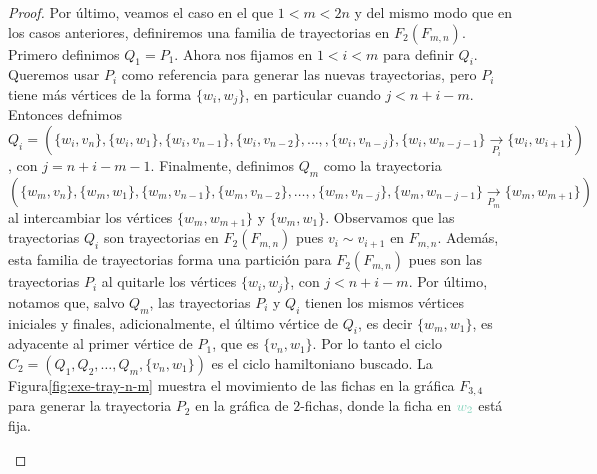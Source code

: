 \begin{proof}
    Por \'ultimo, veamos el caso en el que $1<m<2n$ y del mismo modo que en los
    casos anteriores, definiremos una familia de trayectorias en $F_2(F_{m,n})$.
    Primero definimos $Q_1 =P_1$. Ahora nos fijamos en $1<i<m$ para definir
    $Q_i$. Queremos usar $P_i$ como referencia para generar las nuevas
    trayectorias, pero $P_i$ tiene m\'as v\'ertices de la forma $\{w_i,w_j\}$,
    en particular cuando $j< n+i-m$. Entonces defnimos $Q_i =
    (\{w_i,v_n\},\{w_i,w_1\},\{w_i,v_{n-1}\},\{w_i,v_{n-2}\}, \dots,
    ,\{w_i,v_{n-j}\},\{w_i,w_{n-j-1}\}\xrightarrow[P_i]{}\{w_i,w_{i+1}\})$, con
    $j = n+i-m-1$. Finalmente, definimos $Q_m$ como la trayectoria
    $(\{w_m,v_n\},\{w_m,w_1\},\{w_m,v_{n-1}\},\{w_m,v_{n-2}\}, \dots,
    ,\{w_m,v_{n-j}\},\{w_m,w_{n-j-1}\}\xrightarrow[P_m]{}\{w_m,w_{m+1}\})$ al
    intercambiar los v\'ertices $\{w_m,w_{m+1}\}$ y $\{w_m,w_1\}$. Observamos
    que las trayectorias $Q_i$ son trayectorias en $F_2(F_{m,n})$ pues $v_i \sim
    v_{i+1}$ en $F_{m,n}$. Adem\'as, esta familia de trayectorias forma una
    partici\'on para $F_2(F_{m,n})$ pues son las trayectorias $P_i$ al quitarle
    los v\'ertices $\{w_i,w_j\}$, con $j< n+i-m$. Por \'ultimo, notamos que,
    salvo $Q_m$, las trayectorias $P_i$ y $Q_i$ tienen los mismos v\'ertices
    iniciales y finales, adicionalmente, el \'ultimo v\'ertice de $Q_i$, es
    decir $\{w_m,w_1\}$, es adyacente al primer v\'ertice de $P_1$, que es
    $\{v_n,w_1\}$. Por lo tanto el ciclo $C_2=(Q_1,Q_2, \dots, Q_m,
    \{v_n,w_1\})$ es el ciclo hamiltoniano buscado. La
    Figura\ref{fig:exe-tray-n-m} muestra el movimiento de las fichas en la
    gr\'afica $F_{3,4}$ para generar la trayectoria $P_2$ en la gr\'afica de
    $2$-fichas, donde la ficha en ${\color{azulClaro}w_2}$ est\'a fija.


    \begin{figure}[ht!]
        \centering
\end{figure}
\end{proof}
